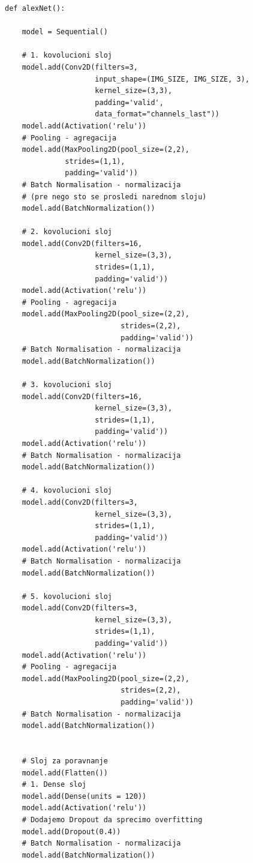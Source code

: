 \documentclass[a4paper]{article}
\begin{document}
\begin{lstlisting}[caption={AlexNet},frame=single, label=code:alexNet]
def alexNet():
    
    model = Sequential()

    # 1. kovolucioni sloj
    model.add(Conv2D(filters=3,
                     input_shape=(IMG_SIZE, IMG_SIZE, 3),
                     kernel_size=(3,3),
                     padding='valid',
                     data_format="channels_last"))
    model.add(Activation('relu'))
    # Pooling - agregacija
    model.add(MaxPooling2D(pool_size=(2,2),
              strides=(1,1),
              padding='valid'))
    # Batch Normalisation - normalizacija
    # (pre nego sto se prosledi narednom sloju)
    model.add(BatchNormalization())

    # 2. kovolucioni sloj
    model.add(Conv2D(filters=16,
                     kernel_size=(3,3),
                     strides=(1,1),
                     padding='valid'))
    model.add(Activation('relu'))
    # Pooling - agregacija
    model.add(MaxPooling2D(pool_size=(2,2),
                           strides=(2,2),
                           padding='valid'))
    # Batch Normalisation - normalizacija
    model.add(BatchNormalization())

    # 3. kovolucioni sloj
    model.add(Conv2D(filters=16,
                     kernel_size=(3,3),
                     strides=(1,1),
                     padding='valid'))
    model.add(Activation('relu'))
    # Batch Normalisation - normalizacija
    model.add(BatchNormalization())

    # 4. kovolucioni sloj
    model.add(Conv2D(filters=3,
                     kernel_size=(3,3),
                     strides=(1,1),
                     padding='valid'))
    model.add(Activation('relu'))
    # Batch Normalisation - normalizacija
    model.add(BatchNormalization())

    # 5. kovolucioni sloj
    model.add(Conv2D(filters=3,
                     kernel_size=(3,3),
                     strides=(1,1),
                     padding='valid'))
    model.add(Activation('relu'))
    # Pooling - agregacija
    model.add(MaxPooling2D(pool_size=(2,2),
                           strides=(2,2),
                           padding='valid'))
    # Batch Normalisation - normalizacija
    model.add(BatchNormalization())


    # Sloj za poravnanje
    model.add(Flatten())
    # 1. Dense sloj
    model.add(Dense(units = 120))
    model.add(Activation('relu'))
    # Dodajemo Dropout da sprecimo overfitting
    model.add(Dropout(0.4))
    # Batch Normalisation - normalizacija
    model.add(BatchNormalization())


\end{lstlisting}
\end{document}
